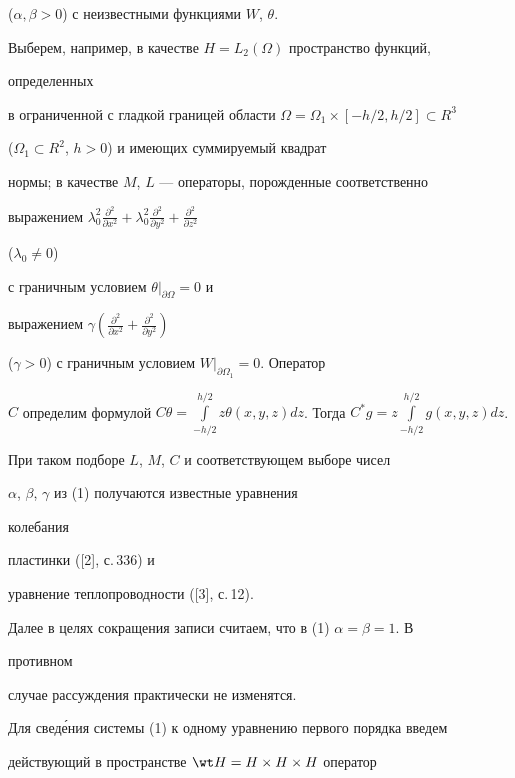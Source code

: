 ($\alpha,\beta>0$) с неизвестными функциями $W$, $\theta$. 


 


Выберем, например, в качестве $H=L_2(\Omega)$ пространство функций, 


определенных 


в ограниченной с гладкой границей области $\Omega= \Omega_1\times 


[-h/2,h/2]\subset R^3$ 


($\Omega_1\subset R^2$, $h>0$) и имеющих суммируемый квадрат 


нормы; в качестве $M$, $L$ --- операторы, порожденные соответственно 


выражением $\lambda^2_0\frac{\partial^2}{\partial x^2}+ \lambda^2_0 


\frac{\partial^2}{\partial y^2}+ \frac{\partial^2}{\partial z^2}$ 


($\lambda_0\ne0$) 


с граничным условием $\theta|_{\partial\Omega}=0$ и 


выражением $\gamma(\frac{\partial^2}{\partial x^2}+ 


\frac{\partial^2}{\partial y^2})$ 


($\gamma>0$) с граничным условием $W|_{\partial\Omega_1}=0$. Оператор 


$C$ определим формулой $C\theta=\int\limits^{h/2}_{-h/2} 


z\theta(x,y,z)dz$. Тогда $C^*g=z\int\limits^{h/2}_{-h/2} g(x,y,z)dz$. 


При таком подборе $L$, $M$, $C$ и соответствующем выборе чисел 


$\alpha$, $\beta$, $\gamma$ из (1) получаются известные уравнения 


колебания 


пластинки ([2], с.\,336) и 


уравнение теплопроводности ([3], с.\,12). 


 


Далее в целях сокращения записи считаем, что в (1) $\alpha=\beta=1$. В 


противном 


случае рассуждения практически не изменятся. 


 


Для свед\'ения системы (1) к одному уравнению первого порядка введем 


действующий в пространстве $\wt H=H\times H\times H$ оператор 


